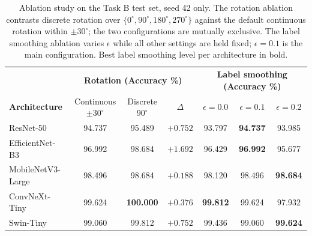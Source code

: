 \begin{table}[t]
\centering
\caption{Ablation study on the Task B test set, seed 42 only. The rotation
ablation contrasts discrete rotation over $\{0^\circ,90^\circ,180^\circ,
270^\circ\}$ against the default continuous rotation within $\pm30^\circ$;
the two configurations are mutually exclusive. The label smoothing ablation
varies $\epsilon$ while all other settings are held fixed; $\epsilon=0.1$
is the main configuration. Best label smoothing level per architecture in bold.}
\label{tab:ablation}
\begin{tabular}{lccc|ccc}
\toprule
& \multicolumn{3}{c|}{\textbf{Rotation (Accuracy \%)}}
& \multicolumn{3}{c}{\textbf{Label smoothing (Accuracy \%)}} \\
\textbf{Architecture} & Continuous $\pm30^\circ$ & Discrete $90^\circ$ & $\Delta$
& $\epsilon=0.0$ & $\epsilon=0.1$ & $\epsilon=0.2$ \\
\midrule
ResNet-50         & 94.737 & 95.489  & $+0.752$ & 93.797 & \textbf{94.737} & 93.985 \\
EfficientNet-B3   & 96.992 & 98.684  & $\mathbf{+1.692}$ & 96.429 & \textbf{96.992} & 95.677 \\
MobileNetV3-Large & 98.496 & 98.684  & $+0.188$ & 98.120 & 98.496 & \textbf{98.684} \\
ConvNeXt-Tiny     & 99.624 & \textbf{100.000} & $+0.376$ & \textbf{99.812} & 99.624 & 97.932 \\
Swin-Tiny         & 99.060 & 99.812  & $+0.752$ & 99.436 & 99.060 & \textbf{99.624} \\
\bottomrule
\end{tabular}
\end{table}
